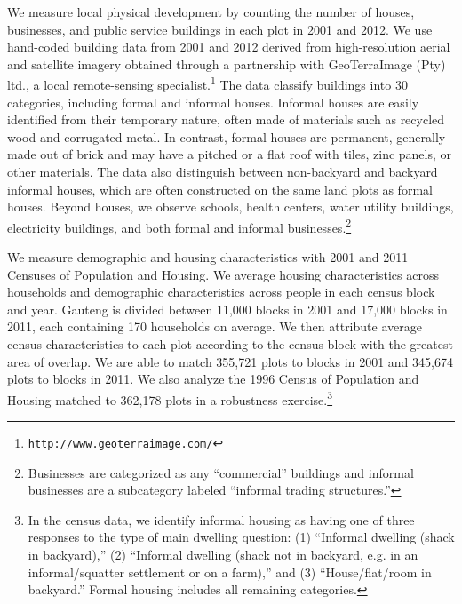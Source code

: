 \documentclass[12pt]{article}
\newcommand{\rv}{}
\begin{document}
We measure local physical development by counting the number of houses, businesses, and public service buildings in each plot in 2001 and 2012.  We use hand-coded building data from 2001 and 2012 derived from high-resolution aerial and satellite imagery obtained through a partnership with GeoTerraImage (Pty) ltd., a local remote-sensing specialist.\footnote{\href{http://www.geoterraimage.com/}{\tt http://www.geoterraimage.com/}} The data classify buildings into 30 categories, including formal and informal houses. Informal houses are easily identified from their temporary nature, often made of materials such as recycled wood and corrugated metal. In contrast, formal houses are permanent, generally made out of brick and may have a pitched or a flat roof with tiles, zinc panels, or other materials.  The data also distinguish between non-backyard and backyard informal houses, which are often constructed on the same land plots as formal houses.  Beyond houses, we observe schools, health centers, water utility buildings, electricity buildings, and both formal and informal businesses.\footnote{Businesses are categorized as any ``commercial'' buildings and informal businesses are a subcategory labeled ``informal trading structures.''}  




We measure demographic and housing characteristics with 2001 and 2011 Censuses of Population and Housing.  We average housing characteristics across households and demographic characteristics across people in each census block and year.  Gauteng is divided between 11,000 blocks in 2001 and 17,000 blocks in 2011, each containing 170 households on average.  We then attribute average census characteristics to each plot according to the census block with the greatest area of overlap.  We are able to match 355,721 plots to blocks in 2001 and 345,674 plots to blocks in 2011.  We also analyze the 1996 Census of Population and Housing matched to 362,178 plots in a robustness exercise.\footnote{\rv{In the census data, we identify informal housing as having one of three responses to the type of main dwelling question: (1) ``Informal dwelling (shack in backyard),'' (2) ``Informal dwelling (shack not in backyard, e.g. in an informal/squatter settlement or on a farm),'' and (3) ``House/flat/room in backyard.''  Formal housing includes all remaining categories.}}
\end{document}
